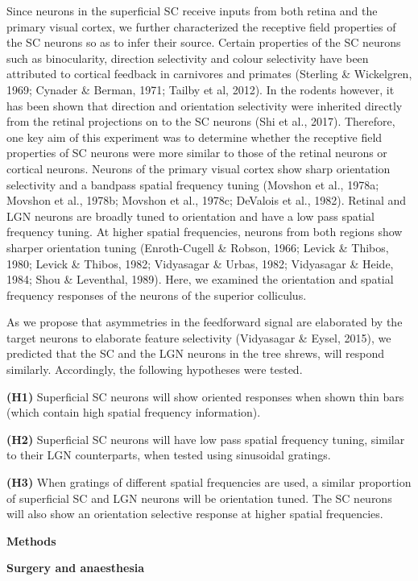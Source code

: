 Since neurons in the superficial SC receive inputs from both retina and
the primary visual cortex, we further characterized the receptive field
properties of the SC neurons so as to infer their source. Certain
properties of the SC neurons such as binocularity, direction selectivity
and colour selectivity have been attributed to cortical feedback in
carnivores and primates (Sterling \& Wickelgren, 1969; Cynader \&
Berman, 1971; Tailby et al, 2012). In the rodents however, it has been
shown that direction and orientation selectivity were inherited directly
from the retinal projections on to the SC neurons (Shi et al., 2017).
Therefore, one key aim of this experiment was to determine whether the
receptive field properties of SC neurons were more similar to those of
the retinal neurons or cortical neurons. Neurons of the primary visual
cortex show sharp orientation selectivity and a bandpass spatial
frequency tuning (Movshon et al., 1978a; Movshon et al., 1978b; Movshon
et al., 1978c; DeValois et al., 1982). Retinal and LGN neurons are
broadly tuned to orientation and have a low pass spatial frequency
tuning. At higher spatial frequencies, neurons from both regions show
sharper orientation tuning (Enroth-Cugell \& Robson, 1966; Levick \&
Thibos, 1980; Levick \& Thibos, 1982; Vidyasagar \& Urbas, 1982;
Vidyasagar \& Heide, 1984; Shou \& Leventhal, 1989). Here, we examined
the orientation and spatial frequency responses of the neurons of the
superior colliculus.

As we propose that asymmetries in the feedforward signal are elaborated
by the target neurons to elaborate feature selectivity (Vidyasagar \&
Eysel, 2015), we predicted that the SC and the LGN neurons in the tree
shrews, will respond similarly. Accordingly, the following hypotheses
were tested.

\textbf{(H1)} Superficial SC neurons will show oriented responses when
shown thin bars (which contain high spatial frequency information).

\textbf{(H2)} Superficial SC neurons will have low pass spatial
frequency tuning, similar to their LGN counterparts, when tested using
sinusoidal gratings.

\textbf{(H3)} When gratings of different spatial frequencies are used, a
similar proportion of superficial SC and LGN neurons will be orientation
tuned. The SC neurons will also show an orientation selective response
at higher spatial frequencies.

\textbf{Methods}

\textbf{Surgery and anaesthesia}

